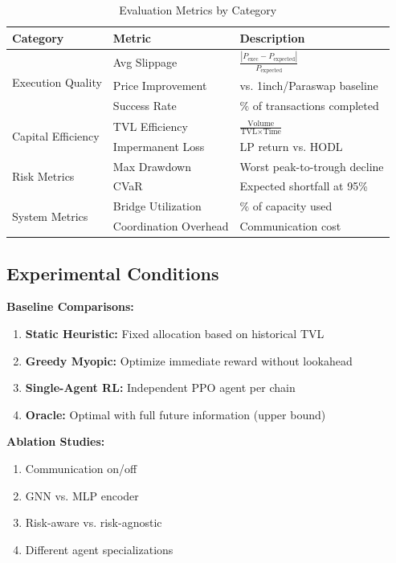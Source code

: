 \documentclass[11pt,a4paper]{article}
\begin{document}
\begin{table}[H]
\centering
\caption{Evaluation Metrics by Category}
\label{tab:metrics}
\begin{tabular}{@{}lll@{}}
\toprule
\textbf{Category} & \textbf{Metric} & \textbf{Description} \\
\midrule
\multirow{3}{*}{Execution Quality} & Avg Slippage & $\frac{|P_{\text{exec}} - P_{\text{expected}}|}{P_{\text{expected}}}$ \\
 & Price Improvement & vs. 1inch/Paraswap baseline \\
 & Success Rate & $\%$ of transactions completed \\
\midrule
\multirow{2}{*}{Capital Efficiency} & TVL Efficiency & $\frac{\text{Volume}}{\text{TVL} \times \text{Time}}$ \\
 & Impermanent Loss & LP return vs. HODL \\
\midrule
\multirow{2}{*}{Risk Metrics} & Max Drawdown & Worst peak-to-trough decline \\
 & CVaR & Expected shortfall at 95\% \\
\midrule
\multirow{2}{*}{System Metrics} & Bridge Utilization & $\%$ of capacity used \\
 & Coordination Overhead & Communication cost \\
\bottomrule
\end{tabular}
\end{table}

\subsection{Experimental Conditions}

\textbf{Baseline Comparisons:}
\begin{enumerate}[leftmargin=2em]
    \item \textbf{Static Heuristic:} Fixed allocation based on historical TVL
    \item \textbf{Greedy Myopic:} Optimize immediate reward without lookahead
    \item \textbf{Single-Agent RL:} Independent PPO agent per chain
    \item \textbf{Oracle:} Optimal with full future information (upper bound)
\end{enumerate}

\textbf{Ablation Studies:}
\begin{enumerate}[leftmargin=2em]
    \item Communication on/off
    \item GNN vs. MLP encoder
    \item Risk-aware vs. risk-agnostic
    \item Different agent specializations
\end{enumerate}
\end{document}
